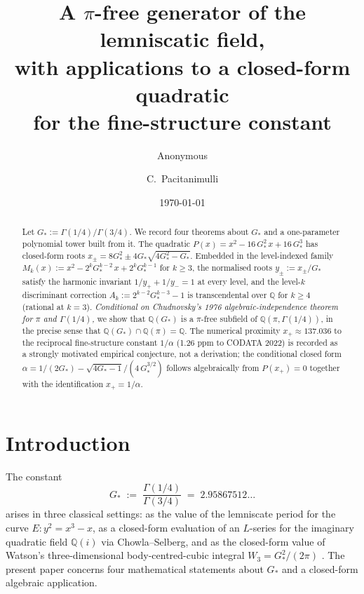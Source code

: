 \documentclass[11pt,reqno]{amsart}
\title[A $\pi$-free generator of the lemniscatic field]
{A $\pi$-free generator of the lemniscatic field,\\
 with applications to a closed-form quadratic\\
 for the fine-structure constant}
\author{Anonymous}
\author{C.\ Pacitanimulli}
\date{\today}
\theoremstyle{plain}
\theoremstyle{definition}
\theoremstyle{remark}
\numberwithin{equation}{section}
\newcommand{\Gstar}{G_{\!*}}
\begin{document}
\begin{abstract}
Let $\Gstar := \Gamma(1/4)/\Gamma(3/4)$. We record four theorems about
$\Gstar$ and a one-parameter polynomial tower built from it. The
quadratic $P(x) = x^{2} - 16\,\Gstar^{2}\,x + 16\,\Gstar^{3}$ has
closed-form roots $x_{\pm} = 8\Gstar^{2} \pm 4\Gstar\sqrt{4\Gstar^{2}
- \Gstar}$. Embedded in the level-indexed family $M_{k}(x) := x^{2} -
2^{k}\Gstar^{k-2}\,x + 2^{k}\Gstar^{k-1}$ for $k \geq 3$, the
normalised roots $y_{\pm} := x_{\pm}/\Gstar$ satisfy the harmonic
invariant $1/y_{+} + 1/y_{-} = 1$ at every level, and the level-$k$
discriminant correction $A_{k} := 2^{k-2}\Gstar^{k-3} - 1$ is
transcendental over $\mathbb{Q}$ for $k \geq 4$ (rational at $k=3$).
\emph{Conditional on Chudnovsky's 1976 algebraic-independence theorem
for $\pi$ and $\Gamma(1/4)$,} we show that $\mathbb{Q}(\Gstar)$ is a
$\pi$-free subfield of $\mathbb{Q}(\pi, \Gamma(1/4))$, in the precise
sense that $\mathbb{Q}(\Gstar) \cap \mathbb{Q}(\pi) = \mathbb{Q}$.
The numerical proximity $x_{+} \approx 137.036$ to the reciprocal
fine-structure constant $1/\alpha$ (1.26 ppm to CODATA 2022) is
recorded as a strongly motivated empirical conjecture, not a
derivation; the conditional closed form
$\alpha = 1/(2\Gstar) - \sqrt{4\Gstar - 1}/(4\,\Gstar^{3/2})$ follows
algebraically from $P(x_{+}) = 0$ together with the identification
$x_{+} = 1/\alpha$.
\end{abstract}

\maketitle

\section{Introduction}
\label{sec:intro}

The constant
\begin{equation}
\label{eq:gstar-def}
  \Gstar \;:=\; \frac{\Gamma(1/4)}{\Gamma(3/4)} \;=\; 2.95867512\ldots
\end{equation}
arises in three classical settings: as the value of the lemniscate
period for the curve $E\colon y^{2} = x^{3} - x$, as a closed-form
evaluation of an $L$-series for the imaginary quadratic field
$\mathbb{Q}(i)$ via Chowla--Selberg, and as the closed-form value of
Watson's three-dimensional body-centred-cubic integral
$W_{3} = \Gstar^{2}/(2\pi)$ \cite{watson1939, glasser-zucker}. The
present paper concerns four mathematical statements about $\Gstar$
and a closed-form algebraic application.
\end{document}
